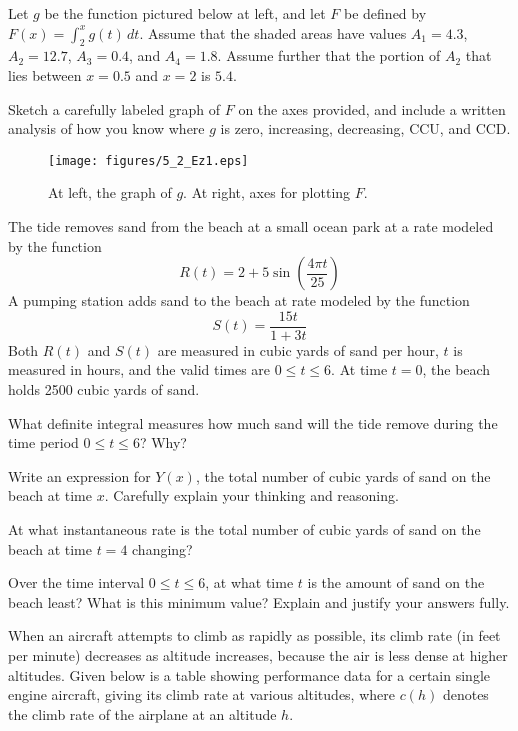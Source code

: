 \begin{exercises} 
	\item Let $g$ be the function pictured below at left, and let $F$ be defined by $F(x) = \int_{2}^x g(t) \, dt.$ Assume that the shaded areas have values $A_1 = 4.3$, $A_2 = 12.7$, $A_3 = 0.4$, and $A_4 = 1.8$.  Assume further that the portion of $A_2$ that lies between $x = 0.5$ and $x = 2$ is $5.4$.  
  
  Sketch a carefully labeled graph of $F$ on the axes provided, and include a written analysis of how you know where $g$ is zero, increasing, decreasing, CCU, and CCD. 
  
  \begin{figure}[h]
  \begin{center}
\texttt{[image: figures/5\_2\_Ez1.eps]}
\end{center}
\caption{At left, the graph of $g$.  At right, axes for plotting $F$.} \label{F:5.2.erf}
  \end{figure}
	
	\item The tide removes sand from the beach at a small ocean park at a rate modeled by the function $$R(t) = 2 + 5\sin \left( \frac{4\pi t}{25} \right)$$
A pumping station adds sand to the beach at rate modeled by the function
$$S(t) = \frac{15t}{1+3t}$$
Both $R(t)$ and $S(t)$ are measured in cubic yards of sand per hour, $t$ is measured in hours, and the valid times are $0 \le t \le 6$.  At time $t = 0$, the beach holds 2500 cubic yards of sand.

	\ba
		\item What definite integral measures how much sand will the tide remove during the time period $0 \le t \le 6$?  Why? 
		\item Write an expression for $Y(x)$, the total number of cubic yards of sand on the beach at time $x$.  Carefully explain your thinking and reasoning.
		\item At what instantaneous rate is the total number of cubic yards of sand on the beach at time $t = 4$ changing?  
		\item Over the time interval $0 \le t \le 6$, at what time $t$ is the amount of sand on the beach least?  What is this minimum value?  Explain and justify your answers fully.
	\ea
	
	\item When an aircraft attempts to climb as rapidly as
possible, its climb rate (in feet per minute) decreases as altitude
increases, because the air is less dense at higher altitudes.
Given below is a table showing performance data for a certain
single engine aircraft, giving its climb rate at various altitudes, where  $c(h)$ denotes the climb rate of the airplane at an altitude $h$.


\end{exercises}
